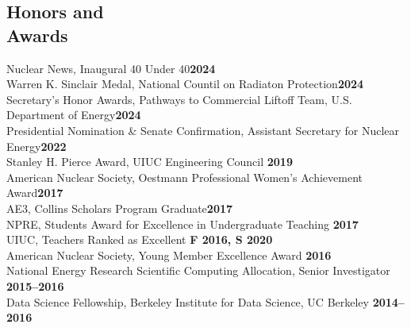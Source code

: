 \documentclass[margin,line]{resume}
\begin{document}
\begin{resume}
    \section{\mysidestyle Honors and\\Awards}
                Nuclear News, Inaugural 40 Under 40\hfill \textbf{2024}\vspace{.5mm}\\%
                Warren K. Sinclair Medal, National Countil on Radiaton Protection\hfill \textbf{2024}\vspace{.5mm}\\%
                Secretary's Honor Awards, Pathways to Commercial Liftoff Team, U.S. Department of Energy\hfill \textbf{2024}\vspace{0.5mm}\\%
                Presidential Nomination \& Senate Confirmation, Assistant Secretary for Nuclear Energy\hfill \textbf{2022}\vspace{.5mm}\\%
                Stanley H. Pierce Award, UIUC Engineering Council \hfill \textbf{2019}\vspace{.5mm}\\%
                American Nuclear Society, Oestmann Professional Women's Achievement Award\hfill \textbf{2017}\vspace{.5mm}\\%
                AE3, Collins Scholars Program Graduate\hfill \textbf{2017}\vspace{.5mm}\\%
                NPRE, Students Award for Excellence in Undergraduate Teaching \hfill \textbf{2017}\vspace{.5mm}\\%
                UIUC, Teachers Ranked as Excellent \hfill \textbf{F 2016, S 2020}\vspace{.5mm}\\%
                American Nuclear Society, Young Member Excellence Award                         \hfill \textbf{2016}\vspace{.5mm}\\%
                National Energy Research Scientific Computing Allocation, Senior Investigator     \hfill \textbf{2015--2016}\vspace{.5mm}\\%
                Data Science Fellowship, Berkeley Institute for Data Science, UC Berkeley     \hfill \textbf{2014--2016}\vspace{.5mm}\\%

\end{resume}
\end{document}
